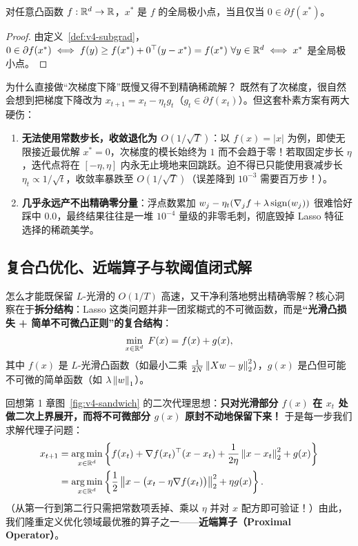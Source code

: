 \begin{proposition}\label{prop:v4-subgrad-opt}
对任意凸函数 $f: \mathbb{R}^d \to \mathbb{R}$，$x^*$ 是 $f$ 的全局极小点，当且仅当 $0 \in \partial f(x^*)$。
\end{proposition}
\begin{proof}
由定义~\ref{def:v4-subgrad}，$0 \in \partial f(x^*) \iff f(y) \ge f(x^*) + 0^\top(y - x^*) = f(x^*)\ \forall y \in \mathbb{R}^d \iff x^*$ 是全局极小点。
\end{proof}

\begin{failBox}{为什么直接做“次梯度下降”既慢又得不到精确稀疏解？}
既然有了次梯度，很自然会想到把梯度下降改为 $x_{t+1} = x_t - \eta_t g_t$（$g_t \in \partial f(x_t)$）。但这套朴素方案有两大硬伤：
\begin{enumerate}
  \item \textbf{无法使用常数步长，收敛退化为 $O(1/\sqrt{T})$}：以 $f(x) = |x|$ 为例，即使无限接近最优解 $x^* = 0$，次梯度的模长始终为 $1$ 而不会趋于零！若取固定步长 $\eta$，迭代点将在 $[-\eta, \eta]$ 内永无止境地来回跳跃。迫不得已只能使用衰减步长 $\eta_t \propto 1/\sqrt{t}$，收敛率暴跌至 $O(1/\sqrt{T})$（误差降到 $10^{-3}$ 需要百万步！）。
  \item \textbf{几乎永远产不出精确零分量}：浮点数累加 $w_j - \eta_t (\nabla_j f + \lambda \operatorname{sign}(w_j))$ 很难恰好踩中 $0.0$，最终结果往往是一堆 $10^{-4}$ 量级的非零毛刺，彻底毁掉 Lasso 特征选择的稀疏美学。
\end{enumerate}
\end{failBox}

\subsection{复合凸优化、近端算子与软阈值闭式解}

怎么才能既保留 $L$-光滑的 $O(1/T)$ 高速，又干净利落地劈出精确零解？核心洞察在于\textbf{拆分结构}：Lasso 这类问题并非一团浆糊式的不可微函数，而是\textbf{“光滑凸损失 + 简单不可微凸正则”的复合结构}：
\begin{equation}\label{eq:v4-composite}
  \min_{x \in \mathbb{R}^d}\; F(x) = f(x) + g(x),
\end{equation}
其中 $f(x)$ 是 $L$-光滑凸函数（如最小二乘 $\frac{1}{2N}\left\|Xw-y\right\|_2^2$），$g(x)$ 是凸但可能不可微的简单函数（如 $\lambda\left\|w\right\|_1$）。

回想第 1 章图~\ref{fig:v4-sandwich} 的二次代理思想：\textbf{只对光滑部分 $f(x)$ 在 $x_t$ 处做二次上界展开，而将不可微部分 $g(x)$ 原封不动地保留下来！} 于是每一步我们求解代理子问题：
\begin{align}
  x_{t+1} &= \operatorname*{arg\,min}_{x \in \mathbb{R}^d} \left\{ f(x_t) + \nabla f(x_t)^\top (x - x_t) + \frac{1}{2\eta}\left\|x - x_t\right\|_2^2 + g(x) \right\} \nonumber \\
  &= \operatorname*{arg\,min}_{x \in \mathbb{R}^d} \left\{ \frac{1}{2}\left\|x - \big(x_t - \eta \nabla f(x_t)\big)\right\|_2^2 + \eta g(x) \right\}. \label{eq:v4-prox-gd-deriv}
\end{align}
（从第一行到第二行只需把常数项丢掉、乘以 $\eta$ 并对 $x$ 配方即可验证！）由此，我们隆重定义优化领域最优雅的算子之一——\textbf{近端算子（Proximal Operator）}。


